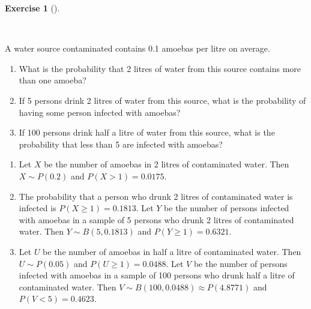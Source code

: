 \documentclass[
  a4paper,
]{scrreport}
\theoremstyle{definition}
\newtheorem{exercise}{Exercise}[chapter]
\theoremstyle{remark}
\begin{document}
\begin{exercise}[]\protect\hypertarget{exr-1}{}\label{exr-1}

~

A water source contaminated contains 0.1 amoebas per litre on average.

\begin{enumerate}
\def\labelenumi{\alph{enumi}.}
\item
  What is the probability that 2 litres of water from this source
  contains more than one amoeba?
\item
  If 5 persons drink 2 litres of water from this source, what is the
  probability of having some person infected with amoebas?
\item
  If 100 persons drink half a litre of water from this source, what is
  the probability that less than 5 are infected with amoebas?
\end{enumerate}

\begin{tcolorbox}[enhanced jigsaw, toprule=.15mm, colbacktitle=quarto-callout-tip-color!10!white, coltitle=black, breakable, colback=white, opacityback=0, opacitybacktitle=0.6, bottomrule=.15mm, bottomtitle=1mm, toptitle=1mm, colframe=quarto-callout-tip-color-frame, rightrule=.15mm, arc=.35mm, leftrule=.75mm, title=\textcolor{quarto-callout-tip-color}{\faLightbulb}\hspace{0.5em}{Solution}, titlerule=0mm, left=2mm]

\begin{enumerate}
\def\labelenumi{\alph{enumi}.}
\item
  Let \(X\) be the number of amoebas in 2 litres of contaminated water.
  Then \(X\sim P(0.2)\) and \(P(X>1)=0.0175\).
\item
  The probability that a person who drunk 2 litres of contaminated water
  is infected is \(P(X\geq 1) = 0.1813\). Let \(Y\) be the number of
  persons infected with amoebas in a sample of 5 persons who drunk 2
  litres of contaminated water. Then \(Y\sim B(5, 0.1813)\) and
  \(P(Y\geq 1)=0.6321\).
\item
  Let \(U\) be the number of amoebas in half a litre of contaminated
  water. Then \(U\sim P(0.05)\) and \(P(U\geq 1)= 0.0488\). Let \(V\) be
  the number of persons infected with amoebas in a sample of 100 persons
  who drunk half a litre of contaminated water. Then
  \(V\sim B(100, 0.0488)\approx P(4.8771)\) and \(P(V<5) = 0.4623\).
\end{enumerate}

\end{tcolorbox}

\end{exercise}
\end{document}
